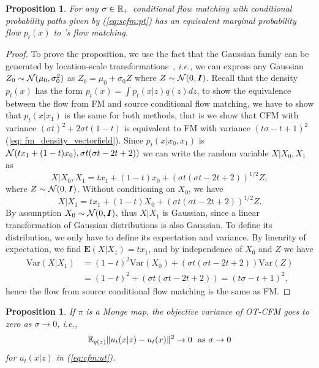 \documentclass[10pt]{article}
\theoremstyle{plain}
\newtheorem{proposition}[theorem]{Proposition}
\theoremstyle{definition}
\theoremstyle{remark}
\newcommand{\ie}{\textit{i.e.}}
\newcommand{\eg}{\textit{e.g.}}
\begin{document}
\begin{proposition}\label{lem:scfm}
For any $\sigma \in \mathbb{R}_+$ conditional flow matching with conditional probability paths given by (\ref{eq:scfm:pt}) has an equivalent marginal probability flow $p_t(x)$ to \citet{lipman_flow_2022}'s flow matching.
\end{proposition}
\begin{proof}
To prove the proposition, we use the fact that the Gaussian family can be generated by location-scale transformations~\citep[see, \eg,][]{lehmann2006theory}, \ie, we can express any Gaussian $Z_0\sim{\mathcal{N}}(\mu_0,\sigma_0^2)$ as $Z_0 = \mu_0 + \sigma_0 Z$ where $Z\sim{\mathcal{N}}(0,{\bm{I}})$. Recall that the density $p_t(x)$ has the form $p_t(x) = \int p_t(x|z)q(z)dz$, to show the equivalence between the flow from FM and source conditional flow matching, we have to show that $p_t(x|x_1)$ is the same for both methods, that is we show that CFM with variance $(\sigma t)^2 + 2 \sigma t (1-t)$ is equivalent to FM with variance $(t \sigma - t + 1)^2$ (\ref{eq: fm_density_vectorfield}). Since $p_t(x|x_0,x_1)$ is ${\mathcal{N}}(tx_1 + (1-t)x_0), \sigma t (\sigma t - 2t + 2))$ we can write the random variable $X|X_0,X_1$ as 
\begin{equation*}
    X|X_0,X_1 = tx_1 + (1-t)x_0 +  (\sigma t (\sigma t - 2t + 2))^{1/2}Z,
\end{equation*}
where $Z\sim{\mathcal{N}}(0,{\bm{I}})$. Without conditioning on $X_0$, we have
\begin{equation*}
    X|X_1 = tx_1 + (1-t)X_0 +  (\sigma t (\sigma t - 2t + 2))^{1/2}Z.
\end{equation*}
By assumption $X_0\sim{\mathcal{N}}(0,{\bm{I}})$, thus $X|X_1$ is Gaussian, since a linear transformation of Gaussian distributions is also Gaussian. To define its distribution, we only have to define its expectation and variance. By linearity of expectation, we find $\mathbf{E}(X|X_1) = tx_1$, and by independence of $X_0$ and $Z$ we have
\begin{align*}
    \mathrm{Var}(X|X_1) &=  (1-t)^2\mathrm{Var}(X_0) +  (\sigma t (\sigma t - 2t + 2))\mathrm{Var}(Z) \\
                        &= (1-t)^2 + (\sigma t (\sigma t - 2t + 2)) = (t \sigma - t + 1)^2,
\end{align*}
hence the flow from source conditional flow matching is the same as FM. 
\end{proof}

\begin{proposition}\label{vrmodels:ut-otcfm}
If $\pi$ is a Monge map, the objective variance of OT-CFM goes to zero as $\sigma \to 0$, \ie,
\begin{equation*}
\mathbb{E}_{q(z)}\|u_t(x|z) - u_t(x)\|^2\to 0 \,\,\,\, \text{as } \sigma \to 0
\end{equation*}
for $u_t(x | z)$ in (\ref{eq:cfm:ut}).
\end{proposition}
\end{document}
